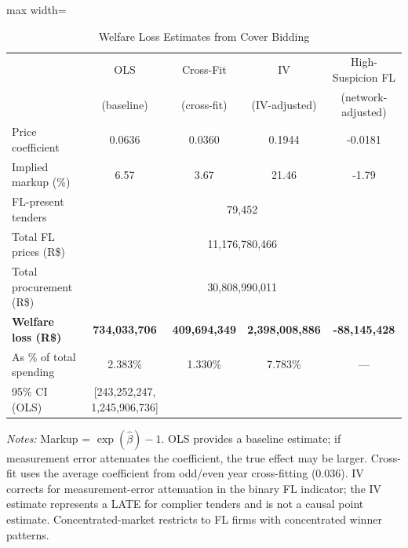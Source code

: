 \begin{table}[htbp]
\centering
\caption{Welfare Loss Estimates from Cover Bidding}
\label{tab:welfare_bounds}
\begin{adjustbox}{max width=\textwidth}
\begin{threeparttable}
\small
\begin{tabular}{lcccc}
\toprule
 & OLS & Cross-Fit & IV & High-Suspicion FL \\
 & (baseline) & (cross-fit) & (IV-adjusted) & (network-adjusted) \\
\midrule
Price coefficient & 0.0636 & 0.0360 & 0.1944 & -0.0181 \\
Implied markup (\%) & 6.57 & 3.67 & 21.46 & -1.79 \\
\midrule
FL-present tenders & \multicolumn{4}{c}{79,452} \\
Total FL prices (R\$) & \multicolumn{4}{c}{11,176,780,466} \\
Total procurement (R\$) & \multicolumn{4}{c}{30,808,990,011} \\
\midrule
\textbf{Welfare loss (R\$)} & \textbf{734,033,706} & \textbf{409,694,349} & \textbf{2,398,008,886} & \textbf{-88,145,428} \\
As \% of total spending & 2.383\% & 1.330\% & 7.783\% & --- \\
95\% CI (OLS) & [243,252,247, 1,245,906,736] & & & \\
\bottomrule
\end{tabular}
\begin{tablenotes}
\small
\item \textit{Notes:} Markup = $\exp(\hat{\beta}) - 1$.
OLS provides a baseline estimate; if measurement error attenuates the coefficient, the true effect may be larger.
Cross-fit uses the average coefficient from odd/even year cross-fitting (0.036).
IV corrects for measurement-error attenuation in the binary FL indicator; the IV estimate represents a LATE for complier tenders and is not a causal point estimate.
Concentrated-market restricts to FL firms with concentrated winner patterns.
\end{tablenotes}
\end{threeparttable}
\end{adjustbox}
\end{table}
